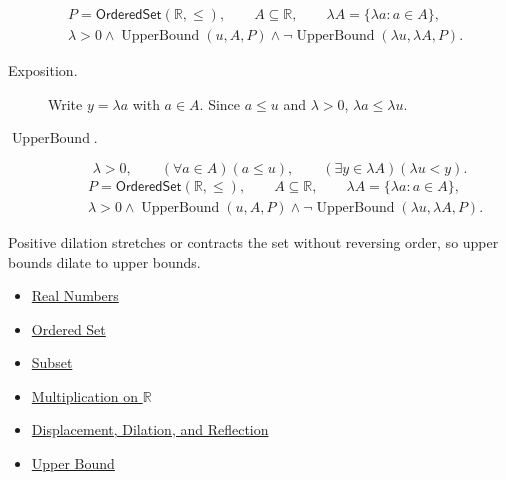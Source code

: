 \begin{remark*}
\[
\begin{aligned}
&P=\mathsf{OrderedSet}(\mathbb{R},\leq),\qquad
A\subseteq\mathbb{R},\qquad \lambda A=\{\lambda a:a\in A\},\\
&\lambda>0\land\operatorname{UpperBound}(u,A,P)\land
\neg\operatorname{UpperBound}(\lambda u,\lambda A,P).
\end{aligned}
\]
\end{remark*}

\begin{remark*}
\begin{description}
\item[Exposition.]
Write $y=\lambda a$ with $a\in A$.  Since $a\leq u$ and $\lambda>0$,
$\lambda a\leq\lambda u$.


  \item[\(\operatorname{UpperBound}.\)]
  \[
\lambda>0,\qquad(\forall a\in A)(a\leq u),\qquad
(\exists y\in\lambda A)(\lambda u<y).
\]
\[
\begin{aligned}
&P=\mathsf{OrderedSet}(\mathbb{R},\leq),\qquad
A\subseteq\mathbb{R},\qquad \lambda A=\{\lambda a:a\in A\},\\
&\lambda>0\land\operatorname{UpperBound}(u,A,P)\land
\neg\operatorname{UpperBound}(\lambda u,\lambda A,P).
\end{aligned}
\]
\end{description}
\end{remark*}

\begin{remark*}[Interpretation]
Positive dilation stretches or contracts the set without reversing order, so
upper bounds dilate to upper bounds.
\end{remark*}

\begin{dependencies}
\begin{itemize}
  \item \hyperref[def:reals]{Real Numbers}
  \item \hyperref[def:ordered-set]{Ordered Set}
  \item \hyperref[def:subset]{Subset}
  \item \hyperref[def:multiplication-on-r]{Multiplication on $\mathbb{R}$}
  \item \hyperref[def:displacement-dilation-reflection]{Displacement, Dilation, and Reflection}
  \item \hyperref[def:real-upper-bound]{Upper Bound}
\end{itemize}
\end{dependencies}

